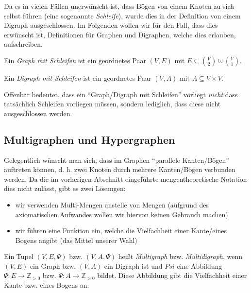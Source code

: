 \documentclass[10pt]{scrbook}
\begin{document}
\begin{Bem}
Da es in vielen Fällen unerwünscht ist, dass Bögen von einem Knoten zu sich selbst führen (eine sogenannte \emph{Schleife}), wurde dies in der Definition von einem Digraph ausgeschlossen. Im Folgenden wollen wir für den Fall, dass dies erwünscht ist, Definitionen für Graphen und Digraphen, welche dies erlauben, aufschreiben.
\end{Bem}

\begin{Def}
Ein \emph{Graph mit Schleifen} ist ein geordnetes Paar $(V, E)$ mit $E\subseteq {V \choose 2} \cupdot {V \choose 1}$.
\end{Def}

\begin{Def}
Ein \emph{Digraph mit Schleifen} ist ein geordnetes Paar $(V, A)$ mit $A\subseteq V \times V$.
\end{Def}

\begin{Bem}
Offenbar bedeutet, dass ein "`Graph/Digraph mit Schleifen"' vorliegt \emph{nicht} dass tatsächlich Schleifen vorliegen müssen, sondern lediglich, dass diese nicht ausgeschlossen werden.
\end{Bem}

\subsection{Multigraphen und Hypergraphen}

Gelegentlich wünscht man sich, dass im Graphen "`parallele Kanten/Bögen"' auftreten können, d. h. zwei Knoten durch mehrere Kanten/Bögen verbunden werden. Da die im vorherigen Abschnitt eingeführte mengentheoretische Notation dies nicht zulässt, gibt es zwei Lösungen:
\begin{itemize}
\item wir verwenden Multi-Mengen anstelle von Mengen (aufgrund des axiomatischen Aufwandes wollen wir hiervon keinen Gebrauch machen)
\item wir führen eine Funktion ein, welche die Vielfachheit einer Kante/eines Bogens angibt (das Mittel unserer Wahl)
\end{itemize}

\begin{Def}
Ein Tupel $(V, E, \Psi)$ bzw. $(V, A, \Psi)$ heißt \emph{Multigraph} bzw. \emph{Multidigraph}, wenn $(V, E)$ ein Graph bzw. $(V, A)$ ein Digraph ist und $Psi$ eine Abbildung $\Psi: E\rightarrow \mathbb{Z}_{>0}$ bzw. $\Psi: A\rightarrow \mathbb{Z}_{>0}$ bildet. Diese Abbildung gibt die Vielfachheit einer Kante bzw. eines Bogens an.
\end{Def}
\end{document}
